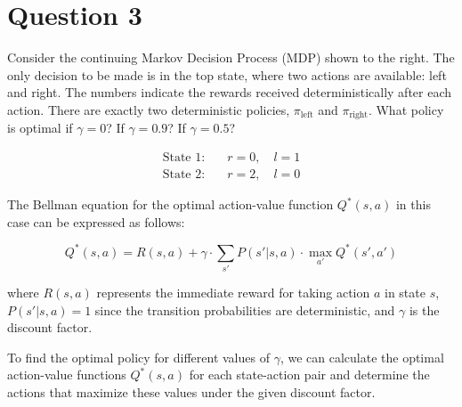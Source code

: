 \section{Question 3}



  Consider the continuing Markov Decision Process (MDP) shown to the right. The only decision to be made is in the top state, where two actions are available: left and right. The numbers indicate the rewards received deterministically after each action. There are exactly two deterministic policies, $\pi_{\text{left}}$ and $\pi_{\text{right}}$. What policy is optimal if $\gamma = 0$? If $\gamma = 0.9$? If $\gamma = 0.5$?

\begin{align*}
\text{State 1:} \quad & r = 0, \quad l = 1 \\
\text{State 2:} \quad & r = 2, \quad l = 0
\end{align*}

The Bellman equation for the optimal action-value function $Q^*(s, a)$ in this case can be expressed as follows:

\[
Q^*(s, a) = R(s, a) + \gamma \cdot \sum_{s'} P(s' | s, a) \cdot \max_{a'} Q^*(s', a')
\]

where $R(s, a)$ represents the immediate reward for taking action $a$ in state $s$, $P(s' | s, a) = 1$ since the transition probabilities are deterministic, and $\gamma$ is the discount factor.

To find the optimal policy for different values of $\gamma$, we can calculate the optimal action-value functions $Q^*(s, a)$ for each state-action pair and determine the actions that maximize these values under the given discount factor.



